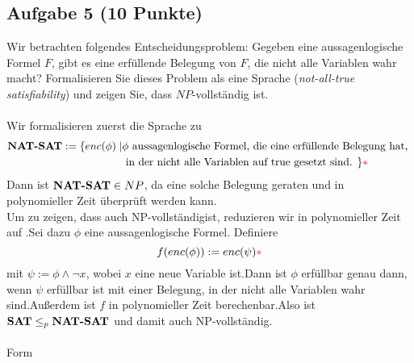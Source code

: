 \subsection*{Aufgabe 5 (10 Punkte)}
    Wir betrachten folgendes Entscheidungsproblem: Gegeben eine aussagenlogische Formel $F$, gibt es eine erfüllende Belegung von $F$, die nicht alle Variablen wahr macht? Formalisieren Sie dieses Problem als eine Sprache  (\textit{not-all-true satisfiability}) und zeigen Sie, dass  $NP$-vollständig ist. \\\\
    \LOES Wir formalisieren zuerst die Sprache zu
    \begin{align*}
        \textbf{NAT-SAT} := \{enc(\phi) \mid & \phi \text{ aussagenlogische Formel, die eine erfüllende Belegung hat, } \\
        & \text{ in der nicht alle Variablen auf true gesetzt sind. } \}{\textcolor{red}{* }}
    \end{align*}
    Dann ist $\textbf{NAT-SAT} \in NP$\POINT, da eine solche Belegung geraten und in polynomieller Zeit überprüft werden kann.\POINT \\
    Um zu zeigen, dass  auch NP-vollständig\POINT ist, reduzieren wir in polynomieller Zeit  auf .\POINT Sei dazu $\phi$ eine aussagenlogische Formel. Definiere
    \begin{equation*}
    f(enc(\phi)) := enc(\psi){\textcolor{red}{* }}
    \end{equation*}
    mit $\psi := \phi \land \neg x$, wobei $x$ eine neue Variable ist.\POINT Dann ist $\phi$ erfüllbar genau dann, wenn $\psi$ erfüllbar ist mit einer Belegung, in der nicht alle Variablen wahr sind.\POINT Außerdem ist $f$ in polynomieller Zeit berechenbar.\POINT Also ist $\textbf{SAT} \leq_p \textbf{NAT-SAT}$ und damit  auch NP-vollständig.\\\\
    Form\POINT


\newpage
